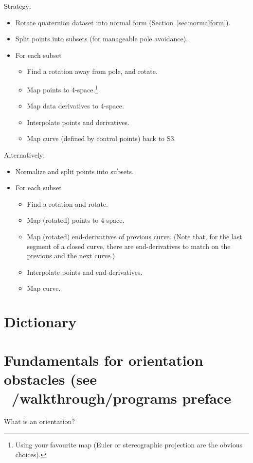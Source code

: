 \documentclass[12pt]{article}
\begin{document}
Strategy:
\begin{itemize}
\item Rotate quaternion dataset into normal form (Section~\ref{sec:normalform}).
\item Split points into subsets (for manageable pole avoidance).
\item For each subset
\begin{itemize}
\item Find a rotation away from pole, and rotate.
\item Map points to 4-space.\footnote{Using your favourite map (Euler or stereographic projection are the obvious choices).}
\item Map data derivatives to 4-space.
\item Interpolate points and derivatives.
\item Map curve (defined by control points) back to S3.
\end{itemize}
\end{itemize}
Alternatively:
\begin{itemize}
\item Normalize and split points into subsets.
\item For each subset
\begin{itemize}
\item Find a rotation and rotate.
\item Map (rotated) points to 4-space.
\item Map (rotated) end-derivatives of previous curve.
      (Note that, for the last segment of a closed curve, there are end-derivatives
       to match on the previous and the next curve.)
\item Interpolate points and end-derivatives.
\item Map curve.
\end{itemize}
\end{itemize}

\section{Dictionary}

\section{Fundamentals for orientation obstacles (see ~/walkthrough/programs preface}

\hspace{.2in} What is an orientation?
\end{document}
